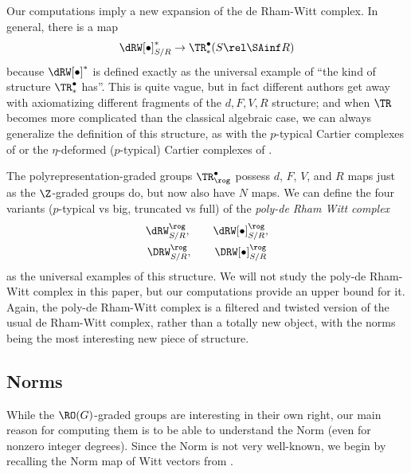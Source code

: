 \begin{remark}
  Our computations imply a new expansion of the de Rham-Witt complex. In general, there is a map
  \[ \dRW[\bullet]^*_{S/R} \to \TR^\bullet_*(S \rel \SAinf R) \]
  because $\dRW[\bullet]^*$ is defined exactly as the universal example of ``the kind of structure $\TR^\bullet_*$ has''. This is quite vague, but in fact different authors get away with axiomatizing different fragments of the $d,F,V,R$ structure; and when $\TR$ becomes more complicated than the classical algebraic case, we can always generalize the definition of this structure, as with the $p$-typical Cartier complexes of \cite[Definition 3.34]{TCart} or the $\eta$-deformed ($p$-typical) Cartier complexes of \cite[Definition 4.17]{CycSyn}.

  The polyrepresentation-graded groups $\TR^\bullet_\rog$ possess $d$, $F$, $V$, and $R$ maps just as the $\Z$-graded groups do, but now also have $N$ maps. We can define the four variants ($p$-typical vs big, truncated vs full) of the \emph{poly-de Rham Witt complex}
  \begin{gather*}
    \dRW^\rog_{S/R}, \qquad \dRW[\bullet]^\rog_{S/R},\\
    \DRW^\rog_{S/R}, \qquad \DRW[\bullet]^\rog_{S/R}
  \end{gather*}
  as the universal examples of this structure. We will not study the poly-de Rham-Witt complex in this paper, but our computations provide an upper bound for it. Again, the poly-de Rham-Witt complex is a filtered and twisted version of the usual de Rham-Witt complex, rather than a totally new object, with the norms being the most interesting new piece of structure.
\end{remark}

\subsection{Norms}
While the $\RO(G)$-graded groups are interesting in their own right, our main reason for computing them is to be able to understand the Norm (even for nonzero integer degrees). Since the Norm is not very well-known, we begin by recalling the Norm map of Witt vectors from \cite{AngeltveitNorm,PrismsTambara1}.

